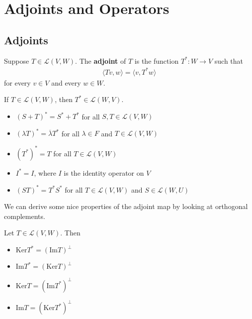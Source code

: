 \documentclass{memoir}
\begin{document}
\chapter{Adjoints and Operators}
\label{cha:operators}

\section{Adjoints}
\label{sec:adjoints}

\begin{defn}[adjoint]
	Suppose $T \in \mathcal{L}(V,W)$. The \textbf{adjoint} of $T$ is the function $T^{*}:W\to V$ such that
	\begin{align*}
		 \langle Tv, w \rangle = \langle v, T^{*}w \rangle 
	\end{align*}
for every $v \in V$ and every $w \in W$.
\end{defn}

\begin{cor}
	If $T \in \mathcal{L}(V,W)$, then $T^{*}\in \mathcal{L}(W,V)$.
\end{cor}
\begin{cor}
	\begin{itemize}
		\item \((S+T)^{*} = S^{*}+T^{*}\) for all \(S,T \in \mathcal{L}(V,W)\)
		\item \((\lambda T)^{*} = \overline{\lambda}T^{*}\) for all \(\lambda \in F\) and \(T \in \mathcal{L}(V,W)\) 
		\item \((T^{*})^{*} = T\) for all \(T \in \mathcal{L}(V,W)\)
		\item \(I^{*}= I\), where \(I\) is the identity operator on \(V\) 
		\item \((ST)^{*} = T^{*}S^{*}\) for all \(T \in \mathcal{L}(V,W)\) and \(S \in \mathcal{L}(W,U)\)
	\end{itemize}
\end{cor}

We can derive some nice properties of the adjoint map by looking at orthogonal complements.

\begin{prop}
	Let \(T \in \mathcal{L}(V,W)\). Then
	\begin{itemize}
		\item \(\textrm{Ker}T^{*} = (\textrm{Im}T)^{\perp}\) 
		\item \(\textrm{Im}T^{*} = (\textrm{Ker}T)^{\perp}\) 
		\item \(\textrm{Ker}T = (\textrm{Im}T^{*})^{\perp}\) 
		\item \(\textrm{Im}T = (\textrm{Ker}T^{*})^{\perp}\)
	\end{itemize}
\end{prop}
\end{document}
